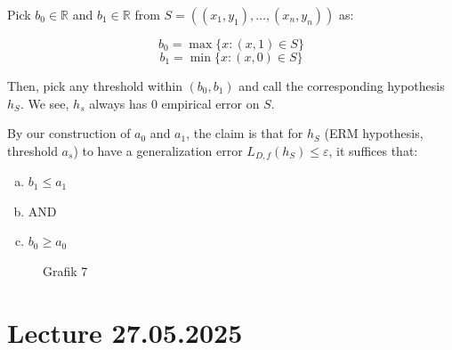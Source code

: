 \documentclass{scrarticle}
\begin{document}
Pick $b_0 \in \mathbb{R}$ and $b_1 \in \mathbb{R}$ from $S=((x_1, y_1), \ldots , (x_n, y_n))$ as:

\begin{equation*}
    b_0 = \max \{x:(x,1) \in S\} 
\end{equation*}
\begin{equation*}
    b_1 = \min \{x:(x,0) \in S\} 
\end{equation*}

Then, pick any threshold within $(b_0, b_1)$ and call the corresponding hypothesis $h_S$. We see, $h_s$ always has $0$ empirical error on $S$. 

By our construction of $a_0$ and $a_1$, the claim is that for $h_S$ (ERM hypothesis, threshold $a_s$) to have a generalization error $L_{D, f} (h_S) \leq \varepsilon$, it suffices that: 

\begin{enumerate}[(a)]
    \item $b_1 \leq a_1$ 
    \item[] AND
    \item $b_0 \geq a_0$
\end{enumerate}

\begin{figure}[ht]
    \centering
    \caption{Grafik 7}
    \label{fig:graphic7}
\end{figure}

\section{Lecture 27.05.2025}
\end{document}
